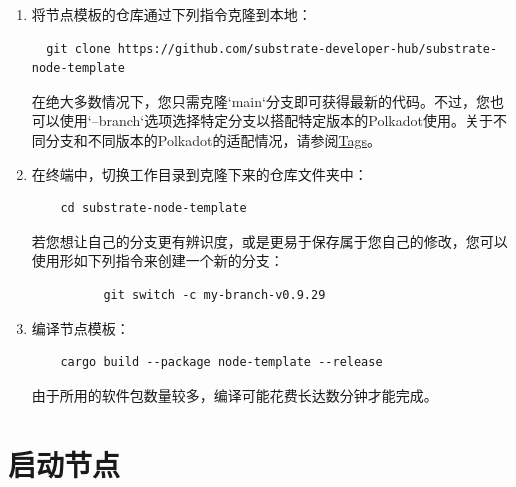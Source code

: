 \begin{enumerate}
  \item 将节点模板的仓库通过下列指令克隆到本地：
        \begin{lstlisting}
  git clone https://github.com/substrate-developer-hub/substrate-node-template
  \end{lstlisting}

        在绝大多数情况下，您只需克隆`main`分支即可获得最新的代码。不过，您也可以使用`--branch`选项选择特定分支以搭配特定版本的Polkadot使用。关于不同分支和不同版本的Polkadot的适配情况，请参阅\href{https://github.com/substrate-developer-hub/substrate-node-template/tags}{Tags}。

  \item 在终端中，切换工作目录到克隆下来的仓库文件夹中：
        \begin{lstlisting}
    cd substrate-node-template
  \end{lstlisting}
        若您想让自己的分支更有辨识度，或是更易于保存属于您自己的修改，您可以使用形如下列指令来创建一个新的分支：
        \begin{lstlisting}
          git switch -c my-branch-v0.9.29
        \end{lstlisting}
  \item 编译节点模板：
        \begin{lstlisting}
    cargo build --package node-template --release
  \end{lstlisting}
        由于所用的软件包数量较多，编译可能花费长达数分钟才能完成。
\end{enumerate}

\section{启动节点}

